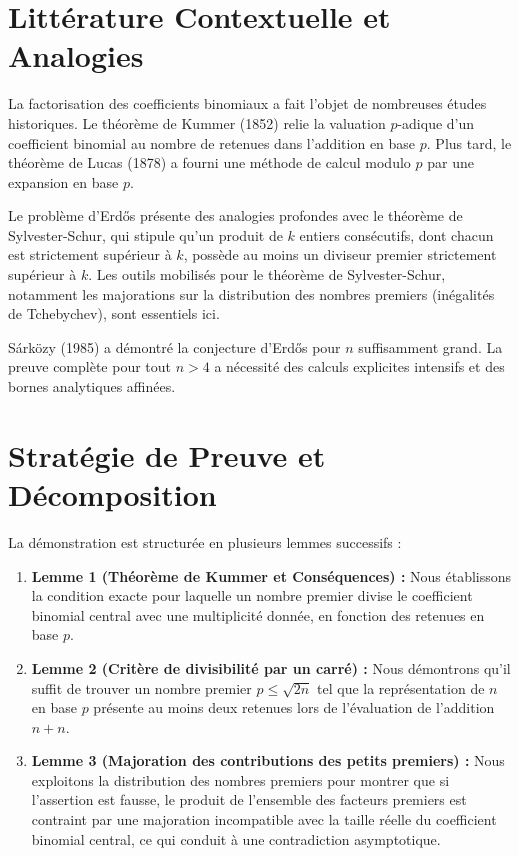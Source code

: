 \documentclass[12pt,a4paper]{article}
\begin{document}
\section{Littérature Contextuelle et Analogies}
La factorisation des coefficients binomiaux a fait l'objet de nombreuses études historiques. Le théorème de Kummer (1852) relie la valuation $p$-adique d'un coefficient binomial au nombre de retenues dans l'addition en base $p$.
Plus tard, le théorème de Lucas (1878) a fourni une méthode de calcul modulo $p$ par une expansion en base $p$.

Le problème d'Erd\H{o}s présente des analogies profondes avec le théorème de Sylvester-Schur, qui stipule qu'un produit de $k$ entiers consécutifs, dont chacun est strictement supérieur à $k$, possède au moins un diviseur premier strictement supérieur à $k$. Les outils mobilisés pour le théorème de Sylvester-Schur, notamment les majorations sur la distribution des nombres premiers (inégalités de Tchebychev), sont essentiels ici.

Sárközy (1985) a démontré la conjecture d'Erd\H{o}s pour $n$ suffisamment grand. La preuve complète pour tout $n>4$ a nécessité des calculs explicites intensifs et des bornes analytiques affinées.

\section{Stratégie de Preuve et Décomposition}
La démonstration est structurée en plusieurs lemmes successifs :
\begin{enumerate}
\item \textbf{Lemme 1 (Théorème de Kummer et Conséquences) :} Nous établissons la condition exacte pour laquelle un nombre premier divise le coefficient binomial central avec une multiplicité donnée, en fonction des retenues en base $p$.
\item \textbf{Lemme 2 (Critère de divisibilité par un carré) :} Nous démontrons qu'il suffit de trouver un nombre premier $p \le \sqrt{2n}$ tel que la représentation de $n$ en base $p$ présente au moins deux retenues lors de l'évaluation de l'addition $n+n$.
\item \textbf{Lemme 3 (Majoration des contributions des petits premiers) :} Nous exploitons la distribution des nombres premiers pour montrer que si l'assertion est fausse, le produit de l'ensemble des facteurs premiers est contraint par une majoration incompatible avec la taille réelle du coefficient binomial central, ce qui conduit à une contradiction asymptotique.
\end{enumerate}
\end{document}
